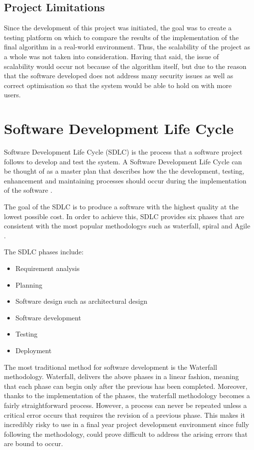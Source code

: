 \subsection {Project Limitations}
Since the development of this project was initiated, the goal was to create a testing platform
on which to compare the results of the implementation of the final algorithm in a real-world
environment. Thus, the scalability of the project as a whole was not taken into consideration. Having that said, the issue of scalability would occur not because of the algorithm itself, but
due to the reason that the software developed does not address many security issues as well as
correct optimisation so that the system would be able to hold on with more users.

\section{Software Development Life Cycle}
Software Development Life Cycle (SDLC) is the process that a software project follows to develop and test the system. A Software Development Life Cycle can be thought of as a master plan that describes how the the development, testing, enhancement and maintaining processes should occur during the implementation of the software \cite{stackify_2017_what}.

The goal of the SDLC is to produce a software with the highest quality at the lowest possible cost. In order to achieve this, SDLC provides six phases that are consistent with the most popular methodologys such as waterfall, spiral and Agile \cite{stackify_2017_what}.

The SDLC phases include:
\begin{itemize}
  \item Requirement analysis
  \item Planning
  \item Software design such as architectural design
  \item Software development
  \item Testing
  \item Deployment
\end{itemize}

The most traditional method for software development is the Waterfall methodology. Waterfall, delivers the above phases in a linear fashion, meaning that each phase can begin only after the previous has been completed. Moreover, thanks to the implementation of the phases, the waterfall methodology becomes a fairly straightforward process. However, a process can never be repeated unless a critical error occurs that requires the revision of a previous phase. This makes it incredibly risky to use in a final year project development environment since fully following the methodology, could prove difficult to address the arising errors that are bound to occur.

